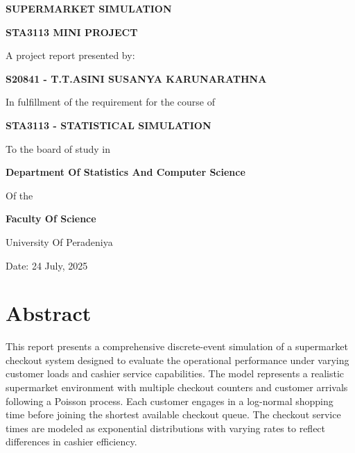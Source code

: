 \documentclass[
]{article}
\author{}
\date{\vspace{-2.5em}}
\begin{document}
\begin{titlepage}
    \centering
    \vspace{4cm}
    {\LARGE\bfseries SUPERMARKET SIMULATION \par}
    \vspace{1cm}
    {\Large\bfseries STA3113 MINI PROJECT\par}
    \vspace{3cm}
    {\large
    A project report presented by:\par}
    {\Large\bfseries S20841 - T.T.ASINI SUSANYA KARUNARATHNA\par}
    \vspace{2.5cm}
    {\large
    In fulfillment of the requirement for the course of\par}
    {\Large\bfseries
    STA3113 - STATISTICAL SIMULATION\par}
    \vspace{2.5cm}
    {\large
    To the board of study in\par}
    {\large\bfseries
    Department Of Statistics And Computer Science\par}
     \vspace{1cm}
    {\large Of the\par}
    {\large\bfseries
    Faculty Of Science\par
    University Of Peradeniya\par
    }
    \vfill
    {\large
    \centering
    Date: 24 July, 2025
    \par
    }
\end{titlepage}

\newpage
\begingroup
\setlength{\parskip}{0pt}
\setlength{\parindent}{0pt}
\centering
\tableofcontents
\endgroup

\newpage
    \centering

\section{Abstract}\label{abstract}

\justifying

This report presents a comprehensive discrete-event simulation of a
supermarket checkout system designed to evaluate the operational
performance under varying customer loads and cashier service
capabilities. The model represents a realistic supermarket environment
with multiple checkout counters and customer arrivals following a
Poisson process. Each customer engages in a log-normal shopping time
before joining the shortest available checkout queue. The checkout
service times are modeled as exponential distributions with varying
rates to reflect differences in cashier efficiency.
\end{document}
